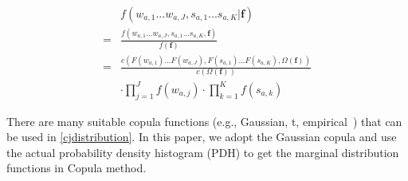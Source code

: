 \begin{equation} \label{cjdistribution}
\begin{aligned}
& f(w_{a,{1} }. . .w_{a,J},s_{a,{1}}. . .s_{a,K}|\mathbf{f}) \\
=& \frac{f(w_{a,{1} }. . .w_{a,J},s_{a,{1}}. . .s_{a,K},\mathbf{f})}{f(\mathbf{f})}\\
=& \frac{c(F(w_{a,{1}})...F(w_{a,J}),F(s_{a,{1}})...F(s_{a,K}),\Omega(\mathbf{f}))}{c(\Omega(\mathbf{f}))} \\
& \cdot \prod_{j=1}^{J}f(w_{a,{j}}) \cdot \prod_{k=1}^{K}f(s_{a,{k}})
\end{aligned}
\end{equation}

 There are many suitable copula functions (e.g., Gaussian, t, empirical~\cite{G_copula}) that can be used in \eqref{cjdistribution}. In this paper, we adopt the Gaussian copula and use the actual {probability density histogram} (PDH) \cite{sce_generation_Ma} to get the marginal distribution functions in Copula method.

